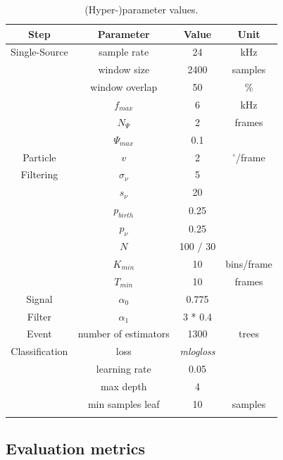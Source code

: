 \begin{table}[th!]
\begin{footnotesize}
\caption{(Hyper-)parameter values.}
    \begin{center}
\begin{tabular}{cccc}
\toprule
Step & Parameter & Value & Unit \\
\midrule
Single-Source &sample rate     & 24    &  kHz\\
&window size      & 2400 &  samples\\
&window overlap  & 50  &  \% \\
&$f_{max}$   &  6     &  kHz\\
&$N_\Psi$  & 2     &  frames\\
&$\Psi_{max}$    & 0.1  &  \\

\midrule
Particle & $v$ & 2     &  $^\circ$/frame\\
Filtering & $\sigma_{\nu}$   & 5     &  \\
& $s_{\nu}$ & 20    &  \\
& $p_{birth}$     & 0.25  &  \\
& $p_{\nu}$    & 0.25  &  \\
& $N$  & 100 / 30    &  \\
&$K_{min}$ & 10     &  bins/frame\\ 
&$T_{min}$  & 10     &  frames\\ 

\midrule
Signal & $\alpha_0$     &  0.775 & \\
Filter & $\alpha_1$     &   3 * 0.4 & \\

\midrule
Event & number of estimators   & 1300       & trees  \\
Classification & loss  &  \textit{mlogloss}    &\\
& learning rate & 0.05& \\
& max depth & 4 & \\
& min samples leaf & 10 & samples \\
\bottomrule
\label{tab:parameter}
\end{tabular}
 \end{center}
\end{footnotesize}
\end{table}


\subsection{Evaluation metrics}

